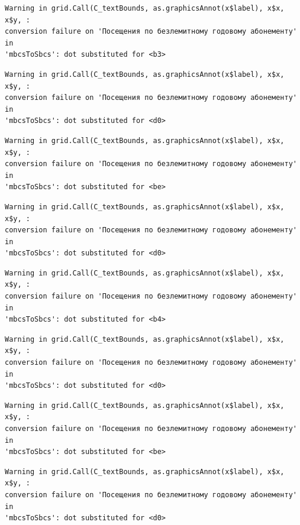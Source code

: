 \documentclass[
  letterpaper,
  DIV=11,
  numbers=noendperiod]{scrartcl}
\begin{document}
\begin{verbatim}
Warning in grid.Call(C_textBounds, as.graphicsAnnot(x$label), x$x, x$y, :
conversion failure on 'Посещения по безлемитному годовому абонементу' in
'mbcsToSbcs': dot substituted for <b3>
\end{verbatim}

\begin{verbatim}
Warning in grid.Call(C_textBounds, as.graphicsAnnot(x$label), x$x, x$y, :
conversion failure on 'Посещения по безлемитному годовому абонементу' in
'mbcsToSbcs': dot substituted for <d0>
\end{verbatim}

\begin{verbatim}
Warning in grid.Call(C_textBounds, as.graphicsAnnot(x$label), x$x, x$y, :
conversion failure on 'Посещения по безлемитному годовому абонементу' in
'mbcsToSbcs': dot substituted for <be>
\end{verbatim}

\begin{verbatim}
Warning in grid.Call(C_textBounds, as.graphicsAnnot(x$label), x$x, x$y, :
conversion failure on 'Посещения по безлемитному годовому абонементу' in
'mbcsToSbcs': dot substituted for <d0>
\end{verbatim}

\begin{verbatim}
Warning in grid.Call(C_textBounds, as.graphicsAnnot(x$label), x$x, x$y, :
conversion failure on 'Посещения по безлемитному годовому абонементу' in
'mbcsToSbcs': dot substituted for <b4>
\end{verbatim}

\begin{verbatim}
Warning in grid.Call(C_textBounds, as.graphicsAnnot(x$label), x$x, x$y, :
conversion failure on 'Посещения по безлемитному годовому абонементу' in
'mbcsToSbcs': dot substituted for <d0>
\end{verbatim}

\begin{verbatim}
Warning in grid.Call(C_textBounds, as.graphicsAnnot(x$label), x$x, x$y, :
conversion failure on 'Посещения по безлемитному годовому абонементу' in
'mbcsToSbcs': dot substituted for <be>
\end{verbatim}

\begin{verbatim}
Warning in grid.Call(C_textBounds, as.graphicsAnnot(x$label), x$x, x$y, :
conversion failure on 'Посещения по безлемитному годовому абонементу' in
'mbcsToSbcs': dot substituted for <d0>
\end{verbatim}
\end{document}
